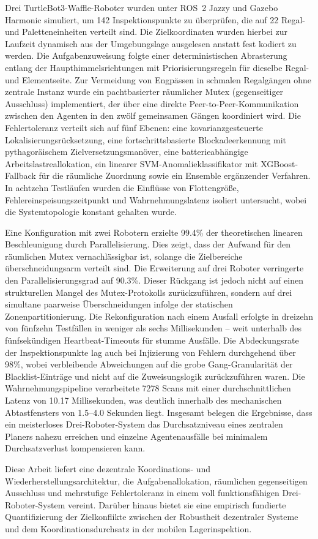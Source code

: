 \vspace*{0.3cm}
\noindent
Drei TurtleBot3-Waffle-Roboter wurden unter ROS~2 Jazzy und Gazebo Harmonic simuliert, um 142 Inspektionspunkte zu überprüfen, die auf 22 Regal- und Paletteneinheiten verteilt sind. Die Zielkoordinaten wurden hierbei zur Laufzeit dynamisch aus der Umgebungslage ausgelesen anstatt fest kodiert zu werden. Die Aufgabenzuweisung folgte einer deterministischen Abrasterung entlang der Haupthimmelsrichtungen mit Priorisierungsregeln für dieselbe Regal- und Elementseite. Zur Vermeidung von Engpässen in schmalen Regalgängen ohne zentrale Instanz wurde ein pachtbasierter räumlicher Mutex (gegenseitiger Ausschluss) implementiert, der über eine direkte Peer-to-Peer-Kommunikation zwischen den Agenten in den zwölf gemeinsamen Gängen koordiniert wird. Die Fehlertoleranz verteilt sich auf fünf Ebenen: eine kovarianzgesteuerte Lokalisierungsrücksetzung, eine fortschrittsbasierte Blockadeerkennung mit pythagoräischem Zielversetzungsmanöver, eine batterieabhängige Arbeitslastreallokation, ein linearer SVM-Anomalieklassifikator mit XGBoost-Fallback für die räumliche Zuordnung sowie ein Ensemble ergänzender Verfahren. In achtzehn Testläufen wurden die Einflüsse von Flottengröße, Fehlereinspeisungszeitpunkt und Wahrnehmungslatenz isoliert untersucht, wobei die Systemtopologie konstant gehalten wurde.

\vspace*{0.3cm}
\noindent
Eine Konfiguration mit zwei Robotern erzielte 99.4\% der theoretischen linearen Beschleunigung durch Parallelisierung. Dies zeigt, dass der Aufwand für den räumlichen Mutex vernachlässigbar ist, solange die Zielbereiche überschneidungsarm verteilt sind. Die Erweiterung auf drei Roboter verringerte den Parallelisierungsgrad auf 90.3\%. Dieser Rückgang ist jedoch nicht auf einen strukturellen Mangel des Mutex-Protokolls zurückzuführen, sondern auf drei simultane paarweise Überschneidungen infolge der statischen Zonenpartitionierung. Die Rekonfiguration nach einem Ausfall erfolgte in dreizehn von fünfzehn Testfällen in weniger als sechs Millisekunden – weit unterhalb des fünfsekündigen Heartbeat-Timeouts für stumme Ausfälle. Die Abdeckungsrate der Inspektionspunkte lag auch bei Injizierung von Fehlern durchgehend über 98\%, wobei verbleibende Abweichungen auf die grobe Gang-Granularität der Blacklist-Einträge und nicht auf die Zuweisungslogik zurückzuführen waren. Die Wahrnehmungspipeline verarbeitete 7278 Scans mit einer durchschnittlichen Latenz von 10.17 Millisekunden, was deutlich innerhalb des mechanischen Abtastfensters von 1.5--4.0 Sekunden liegt. Insgesamt belegen die Ergebnisse, dass ein meisterloses Drei-Roboter-System das Durchsatzniveau eines zentralen Planers nahezu erreichen und einzelne Agentenausfälle bei minimalem Durchsatzverlust kompensieren kann.

\vspace*{0.3cm}
\noindent
Diese Arbeit liefert eine dezentrale Koordinations- und Wiederherstellungsarchitektur, die Aufgabenallokation, räumlichen gegenseitigen Ausschluss und mehrstufige Fehlertoleranz in einem voll funktionsfähigen Drei-Roboter-System vereint. Darüber hinaus bietet sie eine empirisch fundierte Quantifizierung der Zielkonflikte zwischen der Robustheit dezentraler Systeme und dem Koordinationsdurchsatz in der mobilen Lagerinspektion.